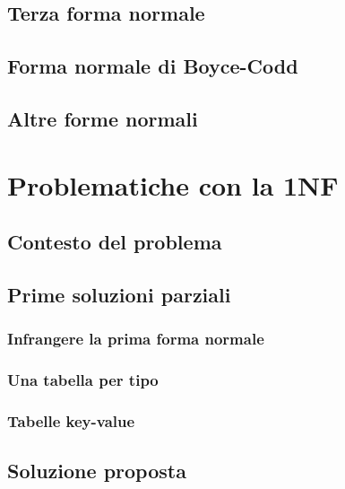 \documentclass[10pt,twoside,cucitura]{toptesi}
\begin{document}
\section{Terza forma normale}


\section{Forma normale di Boyce-Codd}


\section{Altre forme normali}


\chapter{Problematiche con la 1NF}

\section{Contesto del problema}


\section{Prime soluzioni parziali}


\subsection{Infrangere la prima forma normale}
\label{sec:soluzione1}


\subsection{Una tabella per tipo}


\subsection{Tabelle key-value}


\section{Soluzione proposta}
\label{sec:soluzione}


\cleardoublepage
{}
{}
\printbibliography
\end{document}
